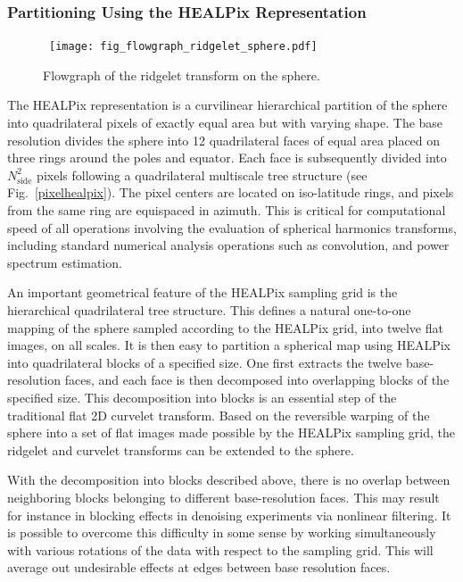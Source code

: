 
\subsubsection{Partitioning Using the HEALPix Representation}
 
 \begin{figure}
\centerline{
\hbox{
\texttt{[image: fig\_flowgraph\_ridgelet\_sphere.pdf]}
}}
\caption{Flowgraph of the ridgelet transform on the sphere.}
\label{Figure:rid_sphere}
\end{figure}

The HEALPix representation is a curvilinear hierarchical partition of the sphere into quadrilateral pixels of exactly equal area but with varying shape. The base resolution divides the sphere into 12 quadrilateral faces of equal area placed on three rings around the poles and equator.  Each face is subsequently divided into $N_{\mathrm{side}}^{2}$ pixels following a quadrilateral multiscale  tree structure (see Fig.~\ref{pixelhealpix}).  The pixel centers are located on iso-latitude rings, and pixels from the same ring are equispaced in azimuth. This is critical for computational speed of all operations involving the evaluation of spherical harmonics transforms, including standard numerical analysis operations such as convolution, and  power spectrum estimation. 

An important geometrical feature of the HEALPix sampling grid is the hierarchical quadrilateral tree structure. This defines a  natural one-to-one mapping of the sphere sampled according to the HEALPix grid, into twelve  flat images, on all scales. It is then easy to partition a spherical map using HEALPix into quadrilateral blocks of a specified size. One first extracts  the twelve base-resolution faces, and each face is then decomposed into overlapping blocks of the specified size. This decomposition into blocks is an essential step of the traditional flat 2D curvelet transform. Based on the reversible warping of the sphere into a set of flat images made possible by the HEALPix sampling grid, the ridgelet and curvelet transforms can be extended to the sphere. 

With the decomposition into blocks described above, there is no overlap between neighboring blocks belonging to different base-resolution faces. This may result for instance in blocking effects in denoising experiments  via nonlinear filtering. It is possible to overcome this difficulty in some sense by working simultaneously  with various rotations of the data with respect to the sampling grid. This will average out undesirable effects at edges between base resolution faces. 

